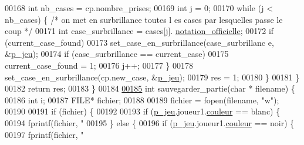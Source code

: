 \begin{DoxyCode}
00168                         \textcolor{keywordtype}{int} nb\_cases = cp.nombre\_prises;
00169                         \textcolor{keywordtype}{int} j = 0;
00170                         \textcolor{keywordflow}{while} (j < nb\_cases) \{ \textcolor{comment}{/* on met en surbrillance toutes l
      es cases par lesquelles passe le coup */}
00171                                 \textcolor{keywordtype}{int} case\_surbrillance = cases[j].
      \hyperlink{structcase__plateau_ad510581b324604a9cf685cbb769a421a}{notation_officielle};
00172                                 \textcolor{keywordflow}{if} (current\_case\_found)
00173                                         set\_case\_en\_surbrillance(case\_surbrillanc
      e, &\hyperlink{moteur_8h_a3efa8d0f7c65daedc584dc8db048e62c}{p_jeu});
00174                                 \textcolor{keywordflow}{if} (case\_surbrillance == current\_case)
00175                                         current\_case\_found = 1;
00176                                 j++;
00177                         \}
00178                         set\_case\_en\_surbrillance(cp.new\_case, &\hyperlink{moteur_8h_a3efa8d0f7c65daedc584dc8db048e62c}{p_jeu});
00179                         res = 1;
00180                 \}
00181         \}
00182         \textcolor{keywordflow}{return} res;
00183 \}
00184 
\hypertarget{moteur_8c_source_l00185}{}\hyperlink{moteur_8h_a9ae4819df5eb9b6f1de826520bf30a8b}{00185} \textcolor{keywordtype}{int} sauvegarder\_partie(\textcolor{keywordtype}{char} * filename) \{
00186         \textcolor{keywordtype}{int} i;
00187         FILE* fichier;
00188 
00189         fichier = fopen(filename, \textcolor{stringliteral}{"w"});
00190 
00191         \textcolor{keywordflow}{if} (fichier) \{
00192 
00193                 \textcolor{keywordflow}{if} (\hyperlink{moteur_8h_a3efa8d0f7c65daedc584dc8db048e62c}{p_jeu}.joueur1.\hyperlink{structjoueur_a057f95a41503a890f27c651969ffac8d}{couleur} == blanc) \{
00194                         fprintf(fichier, \textcolor{stringliteral}{"%
00195                 \} \textcolor{keywordflow}{else} \{
00196                         \textcolor{keywordflow}{if} (\hyperlink{moteur_8h_a3efa8d0f7c65daedc584dc8db048e62c}{p_jeu}.joueur1.\hyperlink{structjoueur_a057f95a41503a890f27c651969ffac8d}{couleur} == noir) \{
00197                                 fprintf(fichier, \textcolor{stringliteral}{"%
}}
\end{DoxyCode}
